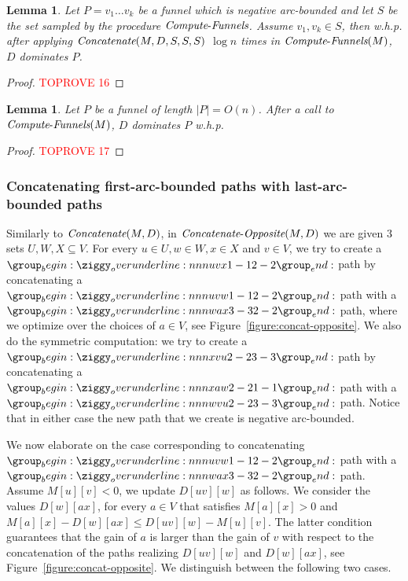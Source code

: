 \documentclass[11pt]{article}
\newtheorem{lemma}[theorem]{Lemma}
\newcommand{\Concat}{\mbox{{\it Concatenate}}}
\newcommand{\CO}{\mbox{{\it Concatenate}-{\it Opposite}}}
\newcommand{\ComputeF}{\mbox{{\it Compute}-{\it Funnels}}}
\begin{document}
\begin{lemma}\label{lemma:concat-sampling-correctness}
    Let $P = v_1 \ldots v_k$ be a funnel which is negative arc-bounded and let $S$ be the set sampled by the procedure $\ComputeF$. Assume $v_1,v_k \in S$, then  w.h.p. after applying $\Concat(M,D,S,S,S)$ $\log n$ times in $\ComputeF(M)$, $D$ dominates $P$.
\end{lemma}

\begin{proof}\textcolor{red}{TOPROVE 16}\end{proof}

\begin{lemma}\label{lemma:funnels-optimality}
    Let $P$ be a funnel of length $|P|=O(n)$. After a call to $\ComputeF(M)$, $D$ dominates $P$ w.h.p.
\end{lemma}

\begin{proof}\textcolor{red}{TOPROVE 17}\end{proof}

\subsubsection{Concatenating first-arc-bounded paths with last-arc-bounded paths}\label{section:CO}
Similarly to $\Concat(M,D)$, in $\CO(M,D)$ we are given $3$ sets $U,W,X\subseteq V$. For every $u\in U,w\in W,x\in X$ and $v\in V$, we try to create a $\overunderline{uvx}{1-1}{2-2}$ path by concatenating a $\overunderline{uvw}{1-1}{2-2}$ path with a $\overunderline{wax}{3-3}{2-2}$ path, where we optimize over the choices of $a \in V$, see Figure~\ref{figure:concat-opposite}. We also do the symmetric computation: we try to create a $\overunderline{xvu}{2-2}{3-3}$ path by concatenating a $\overunderline{xaw}{2-2}{1-1}$ path with a $\overunderline{wvu}{2-2}{3-3}$ path.
Notice that in either case the new path that we create is negative arc-bounded.


We now elaborate on the case corresponding to concatenating  $\overunderline{uvw}{1-1}{2-2}$ path with a $\overunderline{wax}{3-3}{2-2}$ path.
Assume $M[u][v]<0$, we update $D[uv][w]$ as follows. We consider the values $D[w][ax]$, for every $a\in V$ that satisfies $M[a][x]>0$ and $M[a][x]-D[w][ax]\le D[uv][w]-M[u][v]$. The latter condition guarantees that the gain of $a$ is larger than the gain of $v$ with respect to the concatenation of the paths realizing $D[uv][w]$ and $D[w][ax]$, see Figure~\ref{figure:concat-opposite}.
We distinguish between the following two cases.
\end{document}
